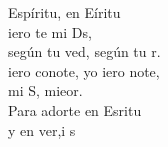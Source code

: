 \begin{cancion}%
	Espíritu, en Eíritu \\
	iero te mi Ds,\\
	según tu ved, según tu r.\\
	iero conote, yo iero note,\\
	mi S, mieor.\\
	Para adorte en Esritu \\
	y en ver,i s \\
\end{cancion}%
